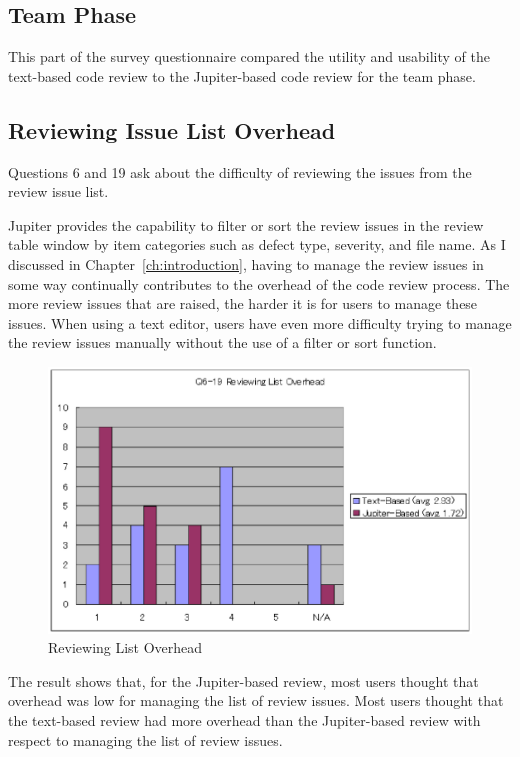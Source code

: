 \subsection{Team Phase}
\label{subsec:team-phase}

This part of the survey questionnaire compared the utility and usability of the text-based code review to the Jupiter-based code review for the team phase.

\subsection{Reviewing Issue List Overhead}
\label{subsec:reviewing-issue-list-overhead}

Questions 6 and 19 ask about the difficulty of reviewing the issues from the review issue list.

Jupiter provides the capability to filter or sort the review issues in the review table window by item categories such as defect type, severity, and file name. As I discussed in Chapter~\ref{ch:introduction}, having to manage the review issues in some way continually contributes to the overhead of the code review process. The more review issues that are raised, the harder it is for users to manage these issues. When using a text editor, users have even more difficulty trying to manage the review issues manually without the use of a filter or sort function.

\begin{figure}[htbp]
  \centering
  \includegraphics{images/fig5-8.eps}
  \caption{Reviewing List Overhead}
  \label{fig5-8}
\end{figure}
 
The result shows that, for the Jupiter-based review, most users thought that overhead was low for managing the list of review issues. Most users thought that the text-based review had more overhead than the Jupiter-based review with respect to managing the list of review issues.

